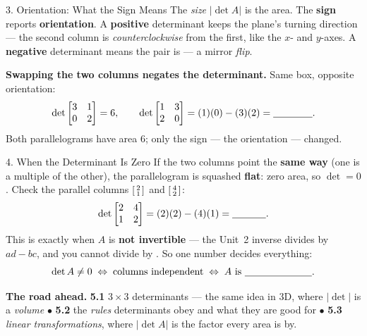 \documentclass[10pt]{article}
\begin{document}
\begin{notesbox}{3. Orientation: What the Sign Means}
The \emph{size} $|\det A|$ is the area. The \textbf{sign} reports \textbf{orientation}. A
\textbf{positive} determinant keeps the plane's turning direction --- the second column is
\emph{counterclockwise} from the first, like the $x$- and $y$-axes. A \textbf{negative} determinant
means the pair is \blank{2.6cm} --- a mirror \emph{flip}.

\vspace{2pt}
\textbf{Swapping the two columns negates the determinant.} Same box, opposite orientation:
\[
  \det\begin{bmatrix} 3 & 1 \\ 0 & 2 \end{bmatrix} = 6,
  \qquad
  \det\begin{bmatrix} 1 & 3 \\ 2 & 0 \end{bmatrix} = (1)(0)-(3)(2) = \blank{1.4cm}.
\]
Both parallelograms have area $6$; only the sign --- the orientation --- changed.
\end{notesbox}

\begin{notesbox}{4. When the Determinant Is Zero}
If the two columns point the \textbf{same way} (one is a multiple of the other), the parallelogram is
squashed \textbf{flat}: zero area, so $\det=0$. Check the parallel columns
$\begin{bsmallmatrix} 2\\1 \end{bsmallmatrix}$ and $\begin{bsmallmatrix} 4\\2 \end{bsmallmatrix}$:
\[
  \det\begin{bmatrix} 2 & 4 \\ 1 & 2 \end{bmatrix} = (2)(2)-(4)(1) = \blank{1.2cm}.
\]
This is exactly when $A$ is \textbf{not invertible} --- the Unit~2 inverse divides by $ad-bc$, and
you cannot divide by \blank{1.2cm}. So one number decides everything:
\[
  \det A \ne 0 \;\Leftrightarrow\; \text{columns independent} \;\Leftrightarrow\; A \text{ is }\blank{2.4cm}.
\]

\vspace{2pt}
\textbf{The road ahead.} \textbf{5.1} $3\times3$ determinants --- the same idea in $3$D, where
$|\det|$ is a \emph{volume}\; $\bullet$\; \textbf{5.2} the \emph{rules} determinants obey and what
they are good for\; $\bullet$\; \textbf{5.3} \emph{linear transformations}, where $|\det A|$ is the
factor every area is \blank{2.4cm} by.
\end{notesbox}
\end{document}
